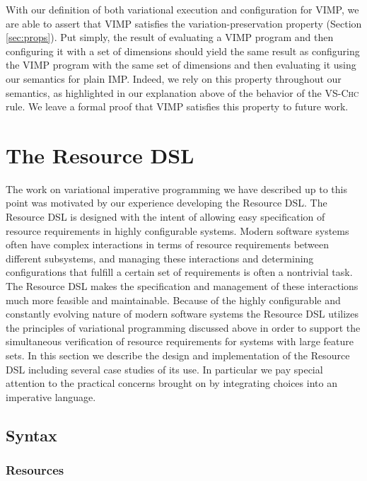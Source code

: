 \documentclass[12pt,oneside]{book}
\begin{document}
With our definition of both variational execution and configuration for VIMP, we are able to assert that VIMP satisfies the variation-preservation property (Section \ref{sec:props}).
Put simply, the result of evaluating a VIMP program and then configuring it with a set of dimensions should yield the same result as configuring the VIMP program with the
same set of dimensions and then evaluating it using our semantics for plain IMP.
Indeed, we rely on this property throughout our semantics, as highlighted in our explanation above of the behavior of the \textsc{VS-Chc} rule. 
We leave a formal proof that VIMP satisfies this property to future work. 

\chapter{The Resource DSL}
\label{ch:rdsl}

The work on variational imperative programming we have described up to this point was motivated
by our experience developing the Resource DSL. The Resource DSL is designed with the intent of
allowing easy specification of resource requirements in highly configurable systems. Modern software
systems often have complex interactions in terms of resource requirements between different subsystems,
and managing these interactions and determining configurations that fulfill a certain set of requirements
is often a nontrivial task. The Resource DSL makes the specification and management
of these interactions much more feasible and maintainable. Because of the highly configurable and constantly evolving
nature of modern software systems the Resource DSL utilizes the principles of variational programming
discussed above in order to support the simultaneous verification of resource requirements for
systems with large feature sets. In this section we describe the design and implementation of the
Resource DSL including several case studies of its use. In particular we pay special attention to the
practical concerns brought on by integrating choices into an imperative language.

\section{Syntax}

\subsection{Resources}
\end{document}
